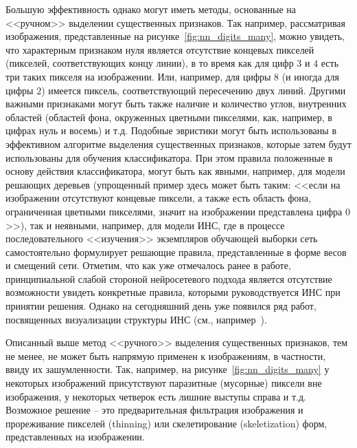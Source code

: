 \documentclass[a4paper,12pt,russian]{article} %
\begin{document}
Большую эффективность однако могут иметь методы, основанные на <<ручном>> выделении существенных признаков.
Так например, рассматривая изображения, представленные на рисунке~\ref{fig:nn_digits_many}, можно увидеть, что характерным признаком нуля является отсутствие концевых пикселей (пикселей, соответствующих концу линии), в то время как для цифр $3$ и $4$ есть три таких пикселя на изображении.
Или, например, для цифры $8$ (и иногда для цифры $2$) имеется пиксель, соответствующий пересечению двух линий.
Другими важными признаками могут быть также наличие и количество углов, внутренних областей (областей фона, окруженных цветными пикселями, как, например, в цифрах нуль и восемь) и т.д.
Подобные эвристики могут быть использованы в эффективном алгоритме выделения существенных признаков, которые затем будут использованы для обучения классификатора.
При этом правила положенные в основу действия классификатора, могут быть как явными, например, для модели решающих деревьев (упрощенный пример здесь может быть таким: <<если на изображении отсутствуют концевые пиксели, а также есть область фона, ограниченная цветными пикселями, значит на изображении представлена цифра $0$>>), так и неявными, например, для модели ИНС, где в процессе последовательного <<изучения>> экземпляров обучающей выборки сеть самостоятельно формулирует решающие правила, представленные в форме весов и смещений сети.
Отметим, что как уже отмечалось ранее в работе, принципиальной слабой стороной нейросетевого подхода является отсутствие возможности увидеть конкретные правила, которыми руководствуется ИНС при принятии решения.
Однако на сегодняшний день уже появился ряд работ, посвященных визуализации структуры ИНС (см., например~\cite{nnvis}).

Описанный выше метод <<ручного>> выделения существенных признаков, тем не менее, не может быть напрямую применен к изображениям, в частности, ввиду их зашумленности.
Так, например, на рисунке~\ref{fig:nn_digits_many} у некоторых изображений присутствуют паразитные (мусорные) пиксели вне изображения, у некоторых четверок есть лишние выступы справа и т.д.
Возможное решение -- это предварительная фильтрация изображения и прореживание пикселей (thinning) или скелетирование (skeletization) форм, представленных на изображении.
\end{document}
